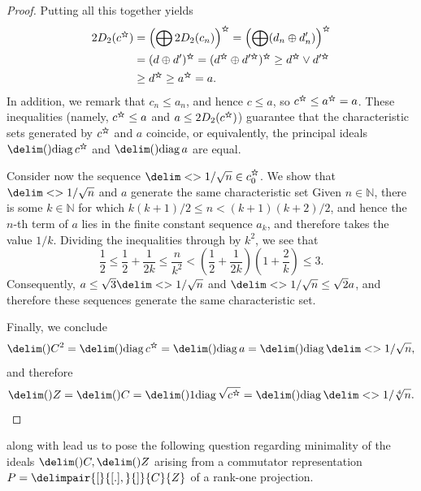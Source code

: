 \documentclass[10pt,reqno]{amsart}
\theoremstyle{remark}
\newcommand\openbigstar[1][0.65]{%
  \scalerel*{%
    \stackinset{c}{0pt}{c}{}{\scalebox{#1}{\color{white}{$\bigstar$}}}{%
      $\bigstar$}%
  }{\bigstar}
}
\DeclareMathOperator{\diag}{diag}
\newcommand{\seq}{\delim<>}
\newcommand{\ideal}{\delim()}
\newcommand{\comm}{\delimpair{[}{[.],}{]}}
\renewcommand{\star}{\openbigstar}
\newcommand{\czstar}{c_0^{\star}}
\numberwithin{equation}{section}
\begin{document}
\begin{proof}
  Putting all this together yields
  \begin{align*}
    2 D_2(c^{\star})
    &= \left(\bigoplus 2 D_2(c_n) \right)^{\star}
      = \left( \bigoplus (d_n \oplus d_n') \right)^{\star} \\
    &= (d \oplus d')^{\star}
      = (d^{\star} \oplus d'^{\star})^{\star}
      \ge d^{\star} \vee d'^{\star} \\
    &\ge d^{\star}
      \ge a^{\star} = a.
  \end{align*}
  In addition, we remark that $c_n \le a_n$, and hence $c \le a$, so $c^{\star} \le a^{\star} = a$.
  These inequalities (namely, $c^{\star} \le a$ and $a \le 2D_2(c^{\star})$) guarantee that the characteristic sets generated by $c^{\star}$ and $a$ coincide, or equivalently, the principal ideals $\ideal{\diag c^{\star}}$ and $\ideal{\diag a}$ are equal.

  Consider now the sequence $\seq{1/\sqrt{n}} \in \czstar$.
  We show that $\seq{1/\sqrt{n}}$ and $a$ generate the same characteristic set
  Given $n \in \mathbb{N}$, there is some $k \in \mathbb{N}$ for which $k(k+1)/2 \le n < (k+1)(k+2)/2$, and hence the $n$-th term of $a$ lies in the finite constant sequence $a_k$, and therefore takes the value $1/k$.
  Dividing the inequalities through by $k^2$, we see that
  \begin{equation*}
    \frac{1}{2} \le \frac{1}{2} + \frac{1}{2k} \le \frac{n}{k^2} < \left(\frac{1}{2} + \frac{1}{2k}\right)\left(1 + \frac{2}{k}\right) \le 3.
  \end{equation*}
  Consequently, $a \le \sqrt{3} \seq{1/\sqrt{n}}$ and $\seq{1/\sqrt{n}} \le \sqrt{2} a$, and therefore these sequences generate the same characteristic set.

  Finally, we conclude
  \begin{equation*}
    \ideal{C}^2 = \ideal{\diag c^{\star}} = \ideal{\diag a} = \ideal{\diag \seq{1/\sqrt{n}}},
  \end{equation*}
  and therefore
  \begin{equation*}
    \ideal{Z} = \ideal{C} = \ideal1{\diag \sqrt{c^{\star}}} = \ideal{\diag \seq{1/\sqrt[4]{n}}}. \qedhere
  \end{equation*}
\end{proof}

 along with  lead us to pose the following question regarding minimality of the ideals $\ideal{C}, \ideal{Z}$ arising from a commutator representation $P = \comm{C}{Z}$ of a rank-one projection.
\end{document}
